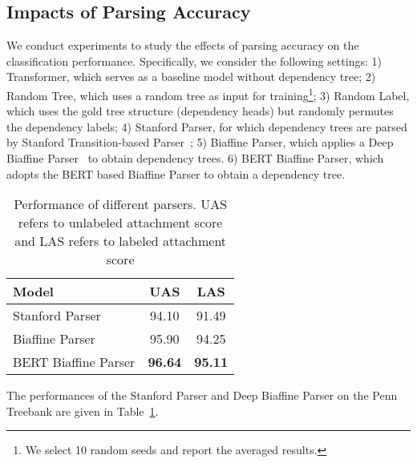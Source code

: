 \documentclass[journal]{IEEEtran}
\begin{document}
	\subsection{Impacts of Parsing Accuracy}
	We conduct experiments to study the effects of parsing accuracy on the classification performance.
	Specifically, we consider the following settings: 1) Transformer, which serves as a baseline model without dependency tree; 2) Random Tree, which uses a random tree as input for training\footnote{We select 10 random seeds and report the averaged results.}; 3) Random Label, which uses the gold tree structure (dependency heads) but randomly permutes the dependency labels; 4) Stanford Parser, for which dependency trees are parsed by Stanford Transition-based Parser~\cite{chen-manning-2014-fast}; 5)  Biaffine Parser, which applies a Deep Biaffine Parser~\cite{dozat2017deep} to obtain dependency trees. 6) BERT Biaffine Parser, which adopts the BERT based Biaffine Parser to obtain a dependency tree.
	\begin{table}
		\centering
		\caption{Performance of different parsers. UAS refers to unlabeled attachment score and LAS refers to labeled attachment score}
		\label{tab:parser}
		\begin{tabular}{lcc}
			\toprule
			Model &UAS &LAS \\
			\midrule
			Stanford Parser &94.10 &91.49 \\
			Biaffine Parser &95.90 &94.25 \\
			BERT Biaffine Parser &\textbf{96.64} &\textbf{95.11} \\
			\bottomrule
		\end{tabular}
	\end{table}	
	The performances of the Stanford Parser and Deep Biaffine Parser on the Penn Treebank are given in Table~\ref{tab:parser}.
	\begin{table}
	\end{table}
\end{document}
